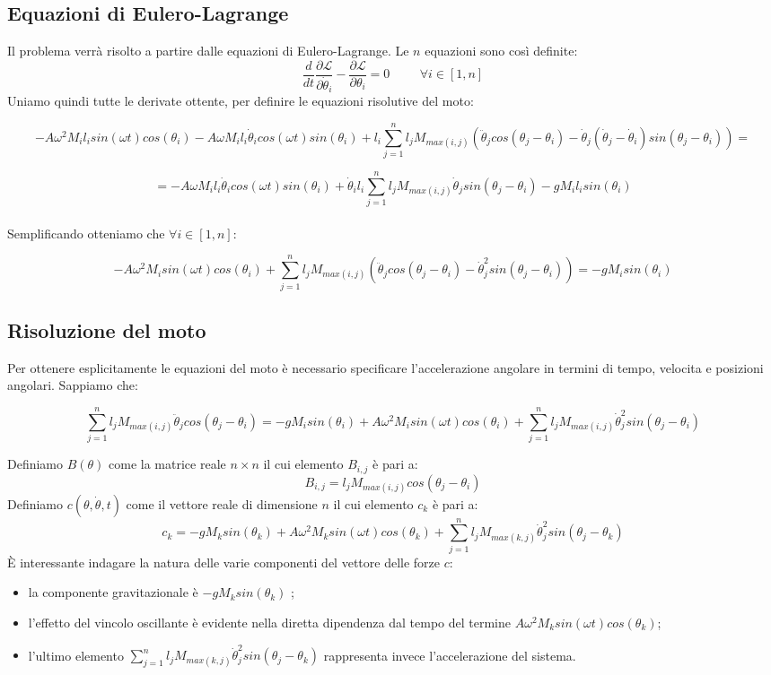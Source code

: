 \documentclass[12pt, a4paper] {article}
\begin{document}
\subsection{Equazioni di Eulero-Lagrange}
Il problema verrà  risolto a partire dalle equazioni di Eulero-Lagrange. Le $n$ equazioni sono così definite:
\[\frac {d}{dt}\frac{\partial \mathcal{L}}{\partial \dot\theta_i}-\frac{\partial \mathcal{L}}{\partial \theta_i}=0\hspace{1cm}\forall i\in[1,n]\]
Uniamo quindi tutte le derivate ottente, per definire le equazioni risolutive del moto:
\begin{adjustwidth}{-2.50cm}{}
\[-A\omega^2M_il_isin(\omega t)cos(\theta_i)-A\omega M_il_i\dot\theta_icos(\omega t)sin(\theta_i)+l_i\sum_{j=1}^{n}l_jM_{max(i,j)}(\ddot\theta_jcos(\theta_j-\theta_i)-\dot\theta_j(\dot\theta_j-\dot\theta_i)sin(\theta_j-\theta_i))=\]
\end{adjustwidth}
\[=-A\omega M_il_i\dot\theta_icos(\omega t)sin(\theta_i)+\dot\theta_il_i\sum_{j=1}^{n}l_jM_{max(i,j)}\dot\theta_jsin(\theta_j-\theta_i)-gM_il_isin(\theta_i)\]
\\
Semplificando otteniamo che $\forall i\in[1,n]$:
\begin{adjustwidth}{-0.50cm}{}
\[-A\omega^2M_isin(\omega t)cos(\theta_i)+\sum_{j=1}^{n}l_jM_{max(i,j)}(\ddot\theta_jcos(\theta_j-\theta_i)-\dot\theta_j^2sin(\theta_j-\theta_i))=-gM_isin(\theta_i)\]
\end{adjustwidth}
\subsection{Risoluzione del moto}
Per ottenere esplicitamente le equazioni del moto è necessario specificare l'accelerazione angolare in termini di tempo, velocita e posizioni angolari.
Sappiamo che:
\begin{adjustwidth}{-1.25cm}{}
\[\sum_{j=1}^{n}l_jM_{max(i,j)}\ddot\theta_jcos(\theta_j-\theta_i)=-gM_isin(\theta_i)+A\omega^2M_isin(\omega t)cos(\theta_i)+\sum_{j=1}^{n}l_jM_{max(i,j)}\dot\theta_j^2sin(\theta_j-\theta_i)\]
\end{adjustwidth}
Definiamo $B(\theta)$ come la matrice reale $n\times n$ il cui elemento $B_{i,j}$ è pari a:
\[B_{i,j}=l_jM_{max(i,j)}cos(\theta_j-\theta_i)\]
Definiamo $c(\theta,\dot\theta,t)$ come il vettore reale di dimensione $n$ il cui elemento $c_k$ è pari a:
\[c_k=-gM_ksin(\theta_k)+A\omega^2M_ksin(\omega t)cos(\theta_k)+\sum_{j=1}^{n}l_jM_{max(k,j)}\dot\theta_j^2sin(\theta_j-\theta_k)\]
È interessante indagare la natura delle varie componenti del vettore delle forze $c$:
\begin{itemize}
  \item la componente gravitazionale è $-gM_ksin(\theta_k)$ ;
  \item l'effetto del vincolo oscillante è evidente nella diretta dipendenza dal tempo del termine $A\omega^2M_ksin(\omega t)cos(\theta_k)$;
  \item l'ultimo elemento $\sum_{j=1}^{n}l_jM_{max(k,j)}\dot\theta_j^2sin(\theta_j-\theta_k)$ rappresenta invece l'accelerazione del sistema.
\end{itemize}
\end{document}
